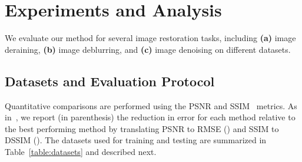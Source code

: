 \documentclass[10pt,twocolumn,letterpaper]{article}
\begin{document}
\section{Experiments and Analysis} 
\label{sec: experiments}
We evaluate our method for several image restoration tasks, including \textbf{(a)} image deraining, \textbf{(b)} image deblurring, and \textbf{(c)} image denoising on  different datasets.





\subsection{Datasets and Evaluation Protocol}
\label{sec:datasets}
 Quantitative comparisons are performed using the PSNR and SSIM~\cite{Wang2004ssim} metrics.
As in~\cite{Brooks2019}, we  report (in parenthesis) the reduction in error for each method relative to the best performing method by translating PSNR to RMSE () and SSIM to DSSIM (). 
The datasets used for training and testing are summarized in Table~\ref{table:datasets} and described next.
\end{document}
